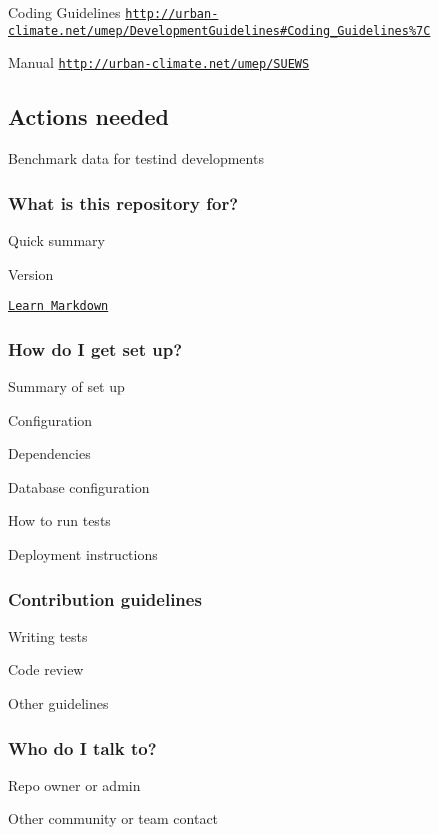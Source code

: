 Coding Guidelines \href{http://urban-climate.net/umep/DevelopmentGuidelines#Coding_Guidelines%7C}{\tt http\+://urban-\/climate.\+net/umep/\+Development\+Guidelines\#\+Coding\+\_\+\+Guidelines\%7C}

Manual \href{http://urban-climate.net/umep/SUEWS}{\tt http\+://urban-\/climate.\+net/umep/\+S\+U\+E\+WS}

\subsection*{Actions needed}

Benchmark data for testind developments

\subsubsection*{What is this repository for?}


\begin{DoxyItemize}
\item Quick summary
\item Version
\item \href{https://bitbucket.org/tutorials/markdowndemo}{\tt Learn Markdown}
\end{DoxyItemize}

\subsubsection*{How do I get set up?}


\begin{DoxyItemize}
\item Summary of set up
\item Configuration
\item Dependencies
\item Database configuration
\item How to run tests
\item Deployment instructions
\end{DoxyItemize}

\subsubsection*{Contribution guidelines}


\begin{DoxyItemize}
\item Writing tests
\item Code review
\item Other guidelines
\end{DoxyItemize}

\subsubsection*{Who do I talk to?}


\begin{DoxyItemize}
\item Repo owner or admin
\item Other community or team contact 
\end{DoxyItemize}